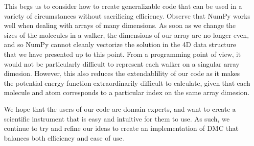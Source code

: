 \documentclass[journal=jacsat,manuscript=article]{achemso}
\begin{document}
This begs us to consider how to create generalizable code that can be used in a variety of circumstances without sacrificing efficiency. Observe that NumPy works well when dealing with arrays of many dimensions. As soon as we change the sizes of the molecules in a walker, the dimensions of our array are no longer even, and so NumPy cannot cleanly vectorize the solution in the 4D data structure that we have presented up to this point. From a programming point of view, it would not be particularly difficult to represent each walker on a singular array dimesion. However, this also reduces the extendablility of our code as it makes the potential energy function extraordinarily difficult to calculate, given that each molecule and atom corresponds to a particular index on the same array dimesion. 

We hope that the users of our code are domain experts, and want to create a scientific instrument that is easy and intuitive for them to use. As such, we continue to try and refine our ideas to create an implementation of DMC that balances both efficiency and ease of use. 
\end{document}

